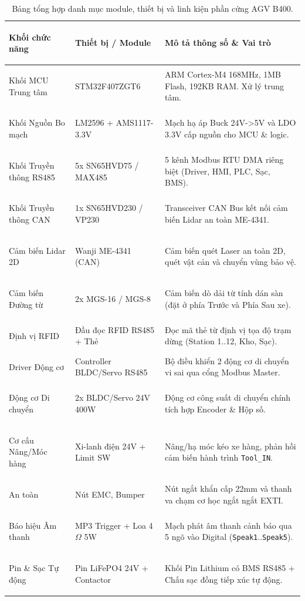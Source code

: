 \documentclass{article}
\begin{document}
\begin{table}[!htbp]
\centering
\begin{tabularx}{\textwidth}{|>{\bfseries\raggedright\arraybackslash}p{3.5cm}|>{\raggedright\arraybackslash}p{4cm}|X|}
\hline
\rowcolor{lightgray} Khối chức năng & Thiết bị / Module & Mô tả thông số \& Vai trò \\ \hline
Khối MCU Trung tâm & STM32F407ZGT6 & ARM Cortex-M4 168MHz, 1MB Flash, 192KB RAM. Xử lý trung tâm. \\ \hline
Khối Nguồn Bo mạch & LM2596 + AMS1117-3.3V & Mạch hạ áp Buck 24V->5V và LDO 3.3V cấp nguồn cho MCU \& logic. \\ \hline
Khối Truyền thông RS485 & 5x SN65HVD75 / MAX485 & 5 kênh Modbus RTU DMA riêng biệt (Driver, HMI, PLC, Sạc, BMS). \\ \hline
Khối Truyền thông CAN & 1x SN65HVD230 / VP230 & Transceiver CAN Bus kết nối cảm biến Lidar an toàn ME-4341. \\ \hline
Cảm biến Lidar 2D & Wanji ME-4341 (CAN) & Cảm biến quét Laser an toàn 2D, quét vật cản và chuyển vùng bảo vệ. \\ \hline
Cảm biến Đường từ & 2x MGS-16 / MGS-8 & Cảm biến dò dải từ tính dán sàn (đặt ở phía Trước và Phía Sau xe). \\ \hline
Định vị RFID & Đầu đọc RFID RS485 + Thẻ & Đọc mã thẻ từ định vị tọa độ trạm dừng (Station 1..12, Kho, Sạc). \\ \hline
Driver Động cơ & Controller BLDC/Servo RS485 & Bộ điều khiển 2 động cơ di chuyển vi sai qua cổng Modbus Master. \\ \hline
Động cơ Di chuyển & 2x BLDC/Servo 24V 400W & Động cơ công suất di chuyển chính tích hợp Encoder \& Hộp số. \\ \hline
Cơ cấu Nâng/Móc hàng & Xi-lanh điện 24V + Limit SW & Nâng/hạ móc kéo xe hàng, phản hồi cảm biến hành trình \texttt{Tool\_IN}. \\ \hline
An toàn & Nút EMC, Bumper & Nút ngắt khẩn cấp 22mm và thanh va chạm cơ học ngắt ngắt EXTI. \\ \hline
Báo hiệu Âm thanh & MP3 Trigger + Loa 4$\Omega$ 5W & Mạch phát âm thanh cảnh báo qua 5 ngõ vào Digital (\texttt{Speak1}..\texttt{Speak5}). \\ \hline
Pin \& Sạc Tự động & Pin LiFePO4 24V + Contactor & Khối Pin Lithium có BMS RS485 + Chấu sạc đồng tiếp xúc tự động. \\ \hline
\end{tabularx}
\caption{Bảng tổng hợp danh mục module, thiết bị và linh kiện phần cứng AGV B400.}
\label{tab:hardware_components}
\end{table}
\end{document}
